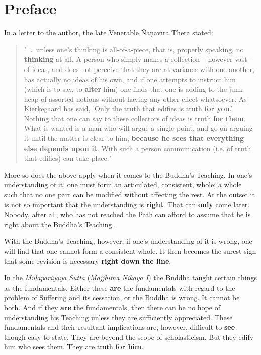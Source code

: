 \chapter{Preface}

In a letter to the author, the late Venerable Ñāṇavīra Thera stated:

\begin{quote}
" \ldots{} unless one's thinking is all-of-a-piece, that is, properly speaking, no \textbf{thinking} at all. A person who simply makes a collection -- however vast -- of ideas, and does not perceive that they are at variance with one another, has actually no ideas of his own, and if one attempts to instruct him (which is to say, to \textbf{alter} him) one finds that one is adding to the junk-heap of assorted notions without having any other effect whatsoever. As Kierkegaard has said, 'Only the truth that edifies is truth \textbf{for you}.' Nothing that one can say to these collectors of ideas is truth \textbf{for them}. What is wanted is a man who will argue a single point, and go on arguing it until the matter is clear to him, \textbf{because he sees that everything else depends upon it}. With such a person communication (i.e. of truth that edifies) can take place."
\end{quote}

More so does the above apply when it comes to the Buddha's Teaching. In one's understanding of it, one must form an articulated, consistent, whole; a whole such that no one part can be modified without affecting the rest. At the outset it is not so important that the understanding is \textbf{right}. That can \textbf{only} come later. Nobody, after all, who has not reached the Path can afford to assume that he is right about the Buddha's Teaching.

With the Buddha's Teaching, however, if one's understanding of it is wrong, one will find that one cannot form a consistent whole. It then becomes the surest sign that some revision is necessary \textbf{right down the line}.

In the \emph{Mūlapariyāya Sutta} (\emph{Majjhima Nikāya I}) the Buddha taught certain things as the fundamentals. Either these \textbf{are} the fundamentals with regard to the problem of Suffering and its cessation, or the Buddha is wrong. It cannot be both. And if they \textbf{are} the fundamentals, then there can be no hope of understanding his Teaching unless they are sufficiently appreciated. These fundamentals and their resultant implications are, however, difficult to \textbf{see} though easy to state. They are beyond the scope of scholasticism. But they edify him who sees them. They are truth \textbf{for him}.

